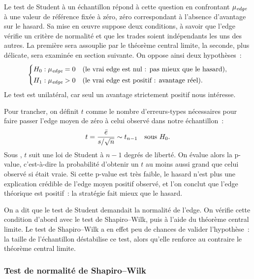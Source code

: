 Le test de Student à un échantillon répond à cette question en
confrontant \(\mu_{\textit{edge}}\) à une valeur de référence fixée à zéro,
zéro correspondant à l'absence d'avantage sur le hasard. Sa mise en
\oe uvre suppose deux conditions, à savoir que l'edge vérifie un critère
de normalité et que les trades soient indépendants les uns des autres.
La première sera assouplie par le théorème central limite, la seconde,
plus délicate, sera examinée en section suivante. On oppose ainsi deux
hypothèses~:
\[
  \begin{cases}
    H_0 : \mu_{\textit{edge}} = 0 & \text{(le vrai edge est nul~: pas mieux que le hasard),}\\[2pt]
    H_1 : \mu_{\textit{edge}} > 0 & \text{(le vrai edge est positif~: avantage réel).}
  \end{cases}
\]
Le test est unilatéral, car seul un avantage strictement positif nous
intéresse.

Pour trancher, on définit \(t\) comme le nombre d'erreurs-types
nécessaires pour faire passer l'edge moyen de zéro à celui observé dans
notre échantillon~:
\[
  t = \frac{\bar e}{s/\sqrt{n}} \sim t_{n-1} \quad\text{sous } H_0 .
\]
Sous \Hzero{}, \(t\) suit une loi de Student à \(n-1\) degrés de
liberté. On évalue alors la p-value, c'est-à-dire la probabilité
d'obtenir un \(t\) au moins aussi grand que celui observé si \Hzero{}
était vraie. Si cette p-value est très faible, le hasard n'est plus une
explication crédible de l'edge moyen positif observé, et l'on conclut
que l'edge théorique est positif~: la stratégie fait mieux que le
hasard.

On a dit que le test de Student demandait la normalité de l'edge. On
vérifie cette condition d'abord avec le test de Shapiro--Wilk, puis à
l'aide du théorème central limite. Le test de Shapiro--Wilk a en effet
peu de chances de valider l'hypothèse~: la taille de l'échantillon
déstabilise ce test, alors qu'elle renforce au contraire le théorème
central limite.

\subsubsection*{Test de normalité de Shapiro--Wilk}

